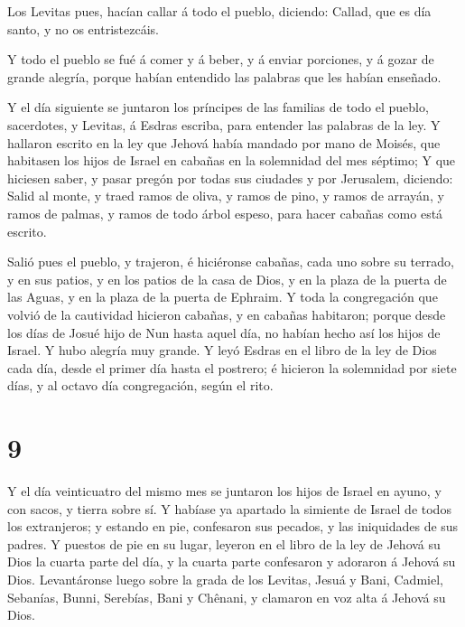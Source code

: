  Los Levitas pues, hacían callar á todo el pueblo,
diciendo: Callad, que es día santo, y no os entristezcáis.

 Y todo el pueblo se fué á comer y á beber, y á enviar
porciones, y á gozar de grande alegría, porque habían entendido las
palabras que les habían enseñado.

 Y el día siguiente se juntaron los príncipes de las
familias de todo el pueblo, sacerdotes, y Levitas, á Esdras escriba,
para entender las palabras de la ley.  Y hallaron escrito
en la ley que Jehová había mandado por mano de Moisés, que habitasen los
hijos de Israel en cabañas en la solemnidad del mes séptimo;
 Y que hiciesen saber, y pasar pregón por todas sus
ciudades y por Jerusalem, diciendo: Salid al monte, y traed ramos de
oliva, y ramos de pino, y ramos de arrayán, y ramos de palmas, y ramos
de todo árbol espeso, para hacer cabañas como está escrito.

 Salió pues el pueblo, y trajeron, é hiciéronse cabañas,
cada uno sobre su terrado, y en sus patios, y en los patios de la casa
de Dios, y en la plaza de la puerta de las Aguas, y en la plaza de la
puerta de Ephraim.  Y toda la congregación que volvió de la
cautividad hicieron cabañas, y en cabañas habitaron; porque desde los
días de Josué hijo de Nun hasta aquel día, no habían hecho así los hijos
de Israel. Y hubo alegría muy grande.  Y leyó Esdras en el
libro de la ley de Dios cada día, desde el primer día hasta el postrero;
é hicieron la solemnidad por siete días, y al octavo día congregación,
según el rito.

\hypertarget{section-8}{%
\section{9}\label{section-8}}

 Y el día veinticuatro del mismo mes se juntaron los hijos
de Israel en ayuno, y con sacos, y tierra sobre sí.  Y
habíase ya apartado la simiente de Israel de todos los extranjeros; y
estando en pie, confesaron sus pecados, y las iniquidades de sus padres.
 Y puestos de pie en su lugar, leyeron en el libro de la ley
de Jehová su Dios la cuarta parte del día, y la cuarta parte confesaron
y adoraron á Jehová su Dios.  Levantáronse luego sobre la
grada de los Levitas, Jesuá y Bani, Cadmiel, Sebanías, Bunni, Serebías,
Bani y Chênani, y clamaron en voz alta á Jehová su Dios.

